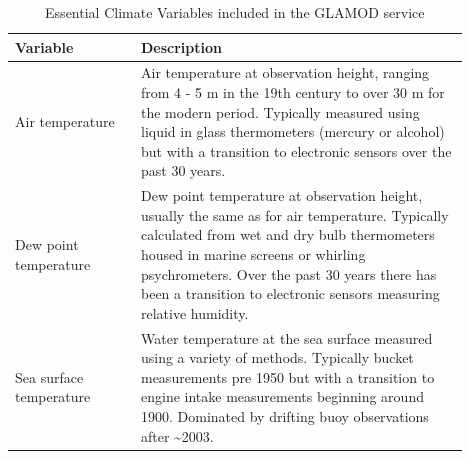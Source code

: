 \begin{table}[h]
\centering
\caption{Essential Climate Variables included in the GLAMOD service}
\label{tab:ecvs}
\begin{tabular}{|p{0.25\linewidth}|p{0.65\linewidth}|}
\hline
\bfseries Variable & \bfseries Description \\ 
\hline
Air temperature & Air temperature at observation height, ranging from 4 - 5 m in the 19th century to over 30 m for the modern period. Typically measured using liquid in glass thermometers (mercury or alcohol) but with a transition to electronic sensors over the past 30 years.\\
\hline
Dew point temperature & Dew point temperature at observation height, usually the same as for air temperature. Typically calculated from wet and dry bulb thermometers housed in marine screens or whirling psychrometers. Over the past 30 years there has been a transition to electronic sensors measuring relative humidity.\\
\hline
Sea surface temperature & Water temperature at the sea surface measured using a variety of methods. Typically bucket measurements pre 1950 but with a transition to engine intake measurements beginning around 1900. Dominated by drifting buoy observations after \sim 2003.\\

\end{tabular}
\end{table}
